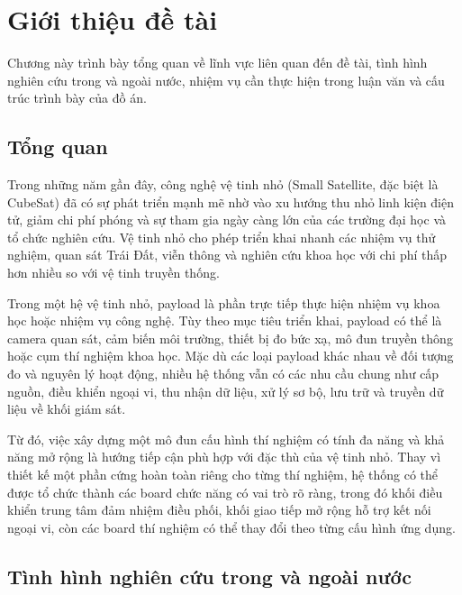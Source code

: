


\chapter{Giới thiệu đề tài}
\label{ch:gioi_thieu}

Chương này trình bày tổng quan về lĩnh vực liên quan đến đề tài, tình hình nghiên cứu trong và ngoài nước, nhiệm vụ cần thực hiện trong luận văn và cấu trúc trình bày của đồ án.

\section{Tổng quan}
\label{sec:tong_quan}

Trong những năm gần đây, công nghệ vệ tinh nhỏ (Small Satellite, đặc biệt là CubeSat) đã có sự phát triển mạnh mẽ nhờ vào xu hướng thu nhỏ linh kiện điện tử, giảm chi phí phóng và sự tham gia ngày càng lớn của các trường đại học và tổ chức nghiên cứu. Vệ tinh nhỏ cho phép triển khai nhanh các nhiệm vụ thử nghiệm, quan sát Trái Đất, viễn thông và nghiên cứu khoa học với chi phí thấp hơn nhiều so với vệ tinh truyền thống.

Trong một hệ vệ tinh nhỏ, payload là phần trực tiếp thực hiện nhiệm vụ khoa học hoặc nhiệm vụ công nghệ. Tùy theo mục tiêu triển khai, payload có thể là camera quan sát, cảm biến môi trường, thiết bị đo bức xạ, mô đun truyền thông hoặc cụm thí nghiệm khoa học. Mặc dù các loại payload khác nhau về đối tượng đo và nguyên lý hoạt động, nhiều hệ thống vẫn có các nhu cầu chung như cấp nguồn, điều khiển ngoại vi, thu nhận dữ liệu, xử lý sơ bộ, lưu trữ và truyền dữ liệu về khối giám sát.

Từ đó, việc xây dựng một mô đun cấu hình thí nghiệm có tính đa năng và khả năng mở rộng là hướng tiếp cận phù hợp với đặc thù của vệ tinh nhỏ. Thay vì thiết kế một phần cứng hoàn toàn riêng cho từng thí nghiệm, hệ thống có thể được tổ chức thành các board chức năng có vai trò rõ ràng, trong đó khối điều khiển trung tâm đảm nhiệm điều phối, khối giao tiếp mở rộng hỗ trợ kết nối ngoại vi, còn các board thí nghiệm có thể thay đổi theo từng cấu hình ứng dụng.

\section{Tình hình nghiên cứu trong và ngoài nước}
\label{sec:tinh_hinh_nghien_cuu}

